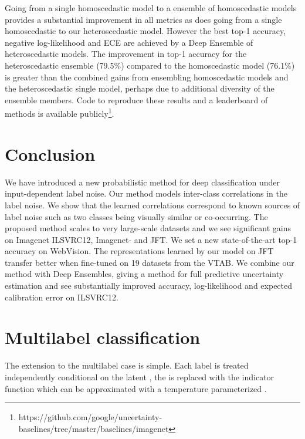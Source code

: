 \documentclass[final]{cvpr}
\begin{document}
Going from a single homoscedastic model to a ensemble of homoscedastic models provides a substantial improvement in all metrics as does going from a single homoscedastic to our heteroscedastic model. However the best top-1 accuracy, negative log-likelihood and ECE are achieved by a Deep Ensemble of heteroscedastic models. The improvement in top-1 accuracy for the heteroscedastic ensemble (79.5\%) compared to the homoscedastic model (76.1\%) is greater than the combined gains from ensembling homoscedastic models and the heteroscedastic single model, perhaps due to additional diversity of the ensemble members. Code to reproduce these results and a leaderboard of methods is available publicly\footnote{https://github.com/google/uncertainty-baselines/tree/master/baselines/imagenet}.

\section{Conclusion}

We have introduced a new probabilistic method for deep classification under input-dependent label noise. Our method models inter-class correlations in the label noise. We show that the learned correlations correspond to known sources of label noise such as two classes being visually similar or co-occurring. The proposed method scales to very large-scale datasets and we see significant gains on Imagenet ILSVRC12, Imagenet- and JFT. We set a new state-of-the-art top-1 accuracy on WebVision. The representations learned by our model on JFT transfer better when fine-tuned on 19 datasets from the VTAB. We combine our method with Deep Ensembles, giving a method for full predictive uncertainty estimation and see substantially improved accuracy, log-likelihood and expected calibration error on ILSVRC12.


\clearpage


{\small

}

\clearpage
\appendix

\section{Multilabel classification}
\label{app:multilabel_classification}

The extension to the multilabel case is simple. Each label is treated independently conditional on the latent , the  is replaced with the  indicator function which can be approximated with a temperature parameterized .
\end{document}
